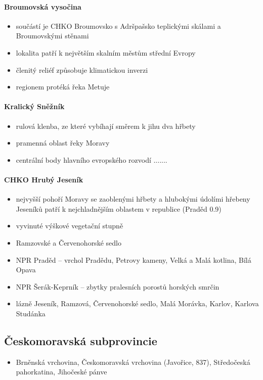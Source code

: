 \paragraph{Broumovská vysočina}
\begin{itemize}
\item součástí je CHKO Broumovsko s Adršpašsko teplickými skálami a Broumovskými stěnami
\item lokalita patří k největším skalním městům střední Evropy
\item členitý reliéf způsobuje klimatickou inverzi
\item regionem protéká řeka Metuje
\end{itemize}

\paragraph{Kralický Sněžník}
\begin{itemize}
\item rulová klenba, ze které vybíhají směrem k jihu dva hřbety
\item pramenná oblast řeky Moravy
\item centrální body hlavního evropského rozvodí  .......
\end{itemize}

\paragraph{CHKO Hrubý Jeseník}
\begin{itemize}
\item nejvyšší pohoří Moravy se zaoblenými hřbety a hlubokými údolími
\itme hřebeny Jeseníků patří k nejchladnějším oblastem v republice (Praděd 0.9)
\item vyvinuté výškové vegetační stupně
\item Ramzovské a Červenohorské sedlo
\item NPR Praděd -- vrchol Pradědu, Petrovy kameny, Velká a Malá kotlina, Bílá Opava
\item NPR Šerák-Keprník -- zbytky pralesních porostů horských smrčin
\item lázně Jeseník, Ramzová, Červenohorské sedlo, Malá Morávka, Karlov, Karlova Studánka
\end{itemize}

\subsection{Českomoravská subprovincie}
\begin{itemize}
\item Brněnská vrchovina, Českomoravská vrchovina (Javořice, 837), Středočeská pahorkatina, Jihočeské pánve
\end{itemize}

